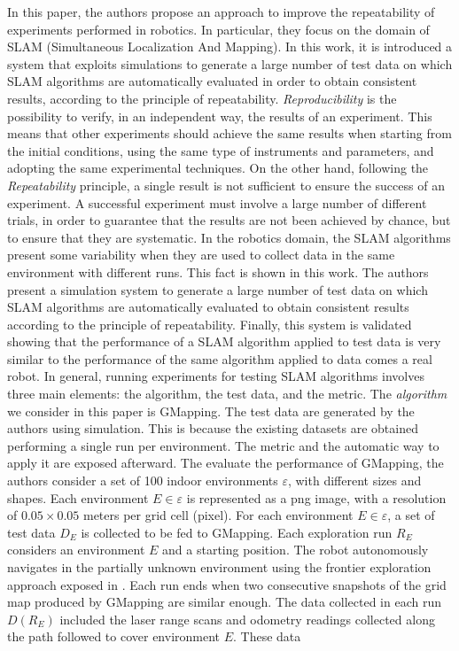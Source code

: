 In this paper, the authors propose an approach to improve the repeatability of experiments performed in robotics. In particular, they focus on the domain of SLAM (Simultaneous Localization And Mapping). In this work, it is introduced a system that exploits simulations to generate
a large number of test data on which SLAM algorithms are
automatically evaluated in order to obtain consistent results,
according to the principle of repeatability. \textit{Reproducibility} is the possibility to verify, in an independent
way, the results of an experiment. This means that other experiments should achieve the same results when starting from the initial conditions, using the same
type of instruments and parameters, and adopting the same
experimental techniques. On the other hand, following the \textit{Repeatability} principle, a single result is not sufficient to ensure the success of an experiment.  A successful experiment must involve a large number of different trials, in order to guarantee that the results are not been achieved by chance, but to ensure that they are systematic. In the robotics domain, the SLAM algorithms present some variability when they are used to collect data in the same environment with different runs. This fact is shown in this work. The authors present a simulation system to generate a large number of test data on which SLAM algorithms are automatically evaluated to obtain consistent results according to the principle of repeatability. Finally, this system is validated showing that the performance of a SLAM algorithm applied to test data is very similar to the performance of the same algorithm applied to data comes a real robot.
In general, running experiments for testing SLAM algorithms involves three main elements: the algorithm, the test
data, and the metric. The \textit{algorithm} we consider in this paper
is GMapping.  The test data are generated by the authors using simulation. This is because the existing datasets are obtained performing a single run per environment. The metric and the automatic way to apply it are exposed afterward. The evaluate the performance of GMapping, the authors consider a set of 100 indoor environments $\varepsilon$, with different sizes and shapes. Each environment $E\in \varepsilon$ is represented as a png image, with a resolution of $0.05 \times 0.05$ meters per grid cell (pixel). For each environment $E \in \varepsilon$, a set of test data $D_E$ is collected to be fed to GMapping. Each exploration run $R_E$ considers an environment $E$ and a starting position. The robot autonomously navigates in the partially unknown environment using the frontier exploration approach exposed in \cite{613851}. Each run ends when two consecutive snapshots of the grid map produced by GMapping are similar enough. The data collected in each run $D(R_E)$ included the laser range scans and odometry readings collected along the path followed to cover environment $E$. These data
